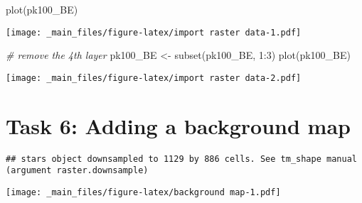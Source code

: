 \documentclass[
]{book}
\newenvironment{Shaded}{\begin{snugshade}}{\end{snugshade}}
\newcommand{\CommentTok}[1]{\textcolor[rgb]{0.56,0.35,0.01}{\textit{#1}}}
\newcommand{\DecValTok}[1]{\textcolor[rgb]{0.00,0.00,0.81}{#1}}
\newcommand{\FunctionTok}[1]{\textcolor[rgb]{0.00,0.00,0.00}{#1}}
\newcommand{\NormalTok}[1]{#1}
\newcommand{\OtherTok}[1]{\textcolor[rgb]{0.56,0.35,0.01}{#1}}
\newcommand{\SpecialCharTok}[1]{\textcolor[rgb]{0.00,0.00,0.00}{#1}}
\begin{document}
\begin{Shaded}
\begin{Highlighting}[]
\FunctionTok{plot}\NormalTok{(pk100\_BE)}
\end{Highlighting}
\end{Shaded}

\texttt{[image: \_main\_files/figure-latex/import raster data-1.pdf]}

\begin{Shaded}
\begin{Highlighting}[]
\CommentTok{\# remove the 4th layer}
\NormalTok{pk100\_BE }\OtherTok{\textless{}{-}} \FunctionTok{subset}\NormalTok{(pk100\_BE, }\DecValTok{1}\SpecialCharTok{:}\DecValTok{3}\NormalTok{)}
\FunctionTok{plot}\NormalTok{(pk100\_BE)}
\end{Highlighting}
\end{Shaded}

\texttt{[image: \_main\_files/figure-latex/import raster data-2.pdf]}

\hypertarget{task-6-adding-a-background-map}{%
\section{Task 6: Adding a background map}\label{task-6-adding-a-background-map}}

\begin{verbatim}
## stars object downsampled to 1129 by 886 cells. See tm_shape manual (argument raster.downsample)
\end{verbatim}

\texttt{[image: \_main\_files/figure-latex/background map-1.pdf]}
\end{document}
